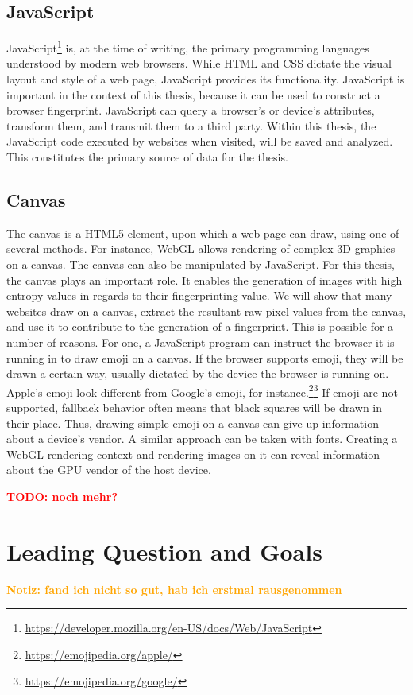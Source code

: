 \documentclass[
    fontsize=12pt,
    headings=small,
    parskip=half,
    bibliography=totoc,
    numbers=noenddot,
    open=any
    ]{scrreprt}
\newcommand{\dominik}[1]{\textcolor{orange}{\textbf{Notiz: #1}}}
\newcommand{\todo}[1]{\textcolor{red}{\textbf{TODO: #1}}}
\begin{document}
\subsection{JavaScript}
\label{fundamentals:javascript}
JavaScript\footnote{\url{https://developer.mozilla.org/en-US/docs/Web/JavaScript}} is,
at the time of writing, the primary programming languages understood
by modern web browsers. While HTML and CSS dictate the visual layout and style
of a web page, JavaScript provides its functionality.
JavaScript is important in the context of this thesis, because
it can be used to construct a browser fingerprint. JavaScript can query
a browser's or device's attributes, transform them, and transmit them
to a third party.
Within this thesis, the JavaScript code executed by websites
when visited, will be saved and analyzed.
This constitutes the primary source of data for the thesis.

\subsection{Canvas}
\label{fundamentals:canvas}
The canvas is a HTML5 element, upon which a web page can draw,
using one of several methods. For instance, WebGL allows rendering of complex
3D graphics on a canvas.
The canvas can also be manipulated by JavaScript. For this thesis,
the canvas plays an important role. It enables the generation
of images with high entropy values in regards to their fingerprinting value.
We will show that many websites draw on a canvas, extract the resultant raw pixel
values from the canvas, and use it to contribute to the generation of a fingerprint.
This is possible for a number of reasons. For one, a JavaScript program
can instruct the browser it is running in to draw emoji on a canvas.
If the browser supports emoji, they will be drawn a certain way, usually dictated
by the device the browser is running on. Apple's emoji look different from Google's
emoji, for instance.\footnote{\url{https://emojipedia.org/apple/}}\footnote{\url{https://emojipedia.org/google/}}
If emoji are not supported, fallback behavior often means that black squares will
be drawn in their place.
Thus, drawing simple emoji on a canvas can give up information about a device's vendor.
A similar approach can be taken with fonts.
Creating a WebGL rendering context and rendering images on it can reveal
information about the GPU vendor of the host device.

\todo{noch mehr?}

\section{Leading Question and Goals}
\dominik{fand ich nicht so gut, hab ich erstmal rausgenommen}
\end{document}
